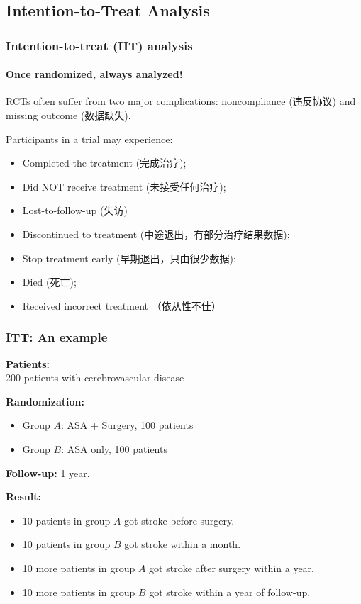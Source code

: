 \documentclass[table,10pt]{beamer}
\begin{document}
\begin{CJK*}{UTF8}{gbsn}
\section{Intention-to-Treat Analysis}

\begin{frame}[t]
\frametitle{Intention-to-treat (IIT) analysis}
\framesubtitle{Once randomized, always analyzed!}
RCTs often suffer from two major complications: \alert{noncompliance (违反协议)} and 
\alert{missing outcome (数据缺失)}.

Participants in a trial may experience:
\begin{itemize}
	\item Completed the treatment (完成治疗);
	\item Did NOT receive treatment (未接受任何治疗);
	\item Lost-to-follow-up (失访)
	\item Discontinued to treatment (中途退出，有部分治疗结果数据);
	\item Stop treatment early (早期退出，只由很少数据);
	\item Died (死亡);
	\item Received incorrect treatment （依从性不佳）
\end{itemize}
\end{frame}

\begin{frame}[t]
\frametitle{ITT: An example}
\textbf{Patients: }\\
200 patients with cerebrovascular disease

\textbf{Randomization: }
\begin{itemize}
	\item Group $A$: ASA + Surgery, 100 patients
	\item Group $B$: ASA only, 100 patients
\end{itemize}

\textbf{Follow-up: }
1 year.

\textbf{Result: }
\begin{itemize}
	\item 10 patients in group $A$ got stroke before surgery.
	\item 10 patients in group $B$ got stroke within a month.
	\item 10 more patients in group $A$ got stroke after surgery within a year.
	\item 10 more patients in group $B$ got stroke within a year of follow-up.
\end{itemize}


\end{frame}
\end{CJK*}
\end{document}
